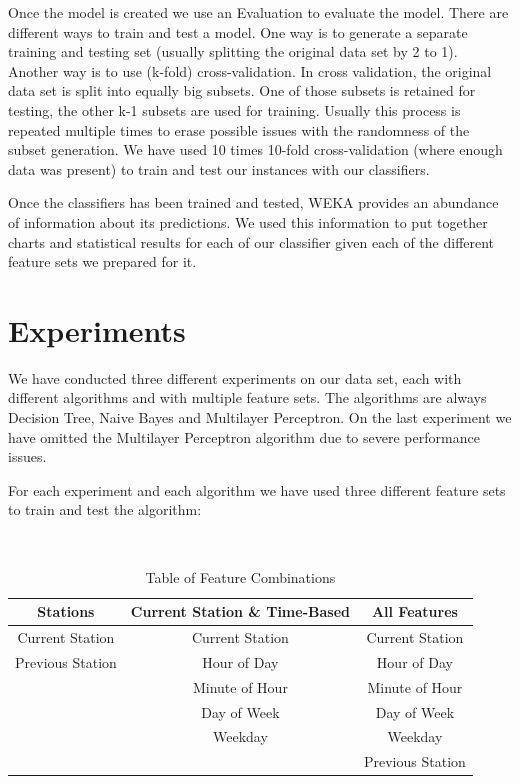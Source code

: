 Once the model is created we use an Evaluation to evaluate the model. There are different ways to train and test a model. One way is to generate a separate training and testing set (usually splitting the original data set by 2 to 1). Another way is to use (k-fold) cross-validation. In cross validation, the original data set is split into equally big subsets. One of those subsets is retained for testing, the other k-1 subsets are used for training. Usually this process is repeated multiple times to erase possible issues with the randomness of the subset generation. We have used 10 times 10-fold cross-validation (where enough data was present) to train and test our instances with our classifiers.

Once the classifiers has been trained and tested, WEKA provides an abundance of information about its predictions. We used this information to put together charts and statistical results for each of our classifier given each of the different feature sets we prepared for it.

\section{Experiments}
\label{sec:experiments}
We have conducted three different experiments on our data set, each with different algorithms and with multiple feature sets. The algorithms are always Decision Tree, Naive Bayes and Multilayer Perceptron. On the last experiment we have omitted the Multilayer Perceptron algorithm due to severe performance issues.

For each experiment and each algorithm we have used three different feature sets to train and test the algorithm:

\mbox{}\\
\begin{table}[H]	
	\begin{center}
		\begin{tabular}{c | c | c}
			\textbf{Stations} & \textbf{Current Station \& Time-Based} & \textbf{All Features} \\
			\hline
			 Current Station  & Current Station & Current Station \\
			 Previous Station & Hour of Day & Hour of Day \\
			  & Minute of Hour & Minute of Hour \\
			  & Day of Week & Day of Week \\
			  & Weekday & Weekday \\
			  & & Previous Station \\
		\end{tabular}
	\end{center}
	\caption{Table of Feature Combinations}
	\label{table:feature_combinations}
\end{table}



